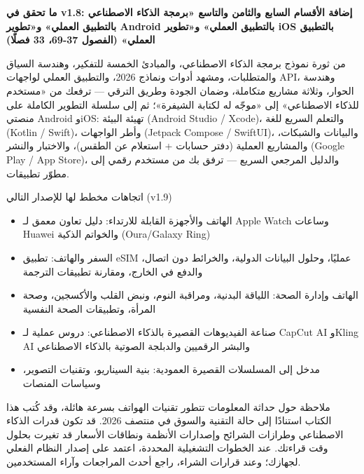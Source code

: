 

\textbf{ما تحقق في v1.8: إضافة الأقسام السابع والثامن والتاسع «برمجة الذكاء الاصطناعي بالتطبيق العملي» و«تطوير Android بالتطبيق العملي» و«تطوير iOS بالتطبيق العملي» (الفصول 37-69، 33 فصلًا)}\par

من ثورة نموذج برمجة الذكاء الاصطناعي، والمبادئ الخمسة للتفكير، وهندسة السياق والمتطلبات، ومشهد أدوات ونماذج 2026، والتطبيق العملي لواجهات API، وهندسة الحوار، وثلاثة مشاريع متكاملة، وضمان الجودة وطريق الترقي — ترفعك من «مستخدم للذكاء الاصطناعي» إلى «موجّه له لكتابة الشيفرة»؛ ثم إلى سلسلة التطوير الكاملة على منصتي Android وiOS: تهيئة البيئة (Android Studio / Xcode)، والتعلم السريع للغة (Kotlin / Swift)، وأطر الواجهات (Jetpack Compose / SwiftUI)، والبيانات والشبكات، والمشاريع العملية (دفتر حسابات + استعلام عن الطقس)، والاختبار والنشر (Google Play / App Store)، والدليل المرجعي السريع — ترفق بك من مستخدم رقمي إلى مطوّر تطبيقات.

\begin{tcbinfo}{اتجاهات مخطط لها للإصدار التالي (v1.9)}
\begin{itemize}
  \item الهاتف والأجهزة القابلة للارتداء: دليل تعاون معمق لـ Apple Watch وساعات Huawei والخواتم الذكية (Oura/Galaxy Ring)
  \item السفر والهاتف: تطبيق eSIM عمليًا، وحلول البيانات الدولية، والخرائط دون اتصال، والدفع في الخارج، ومقارنة تطبيقات الترجمة
  \item الهاتف وإدارة الصحة: اللياقة البدنية، ومراقبة النوم، ونبض القلب والأكسجين، وصحة المرأة، وتطبيقات الصحة النفسية
  \item صناعة الفيديوهات القصيرة بالذكاء الاصطناعي: دروس عملية لـ CapCut AI وKling AI والبشر الرقميين والدبلجة الصوتية بالذكاء الاصطناعي
  \item مدخل إلى المسلسلات القصيرة العمودية: بنية السيناريو، وتقنيات التصوير، وسياسات المنصات
\end{itemize}

\end{tcbinfo}

\begin{tcbwarn}{ملاحظة حول حداثة المعلومات}
تتطور تقنيات الهواتف بسرعة هائلة، وقد كُتب هذا الكتاب استنادًا إلى حالة التقنية والسوق في منتصف 2026. قد تكون قدرات الذكاء الاصطناعي وطرازات الشرائح وإصدارات الأنظمة ونطاقات الأسعار قد تغيرت بحلول وقت قراءتك. عند الخطوات التشغيلية المحددة، اعتمد على إصدار النظام الفعلي لجهازك؛ وعند قرارات الشراء، راجع أحدث المراجعات وآراء المستخدمين.

\end{tcbwarn}
